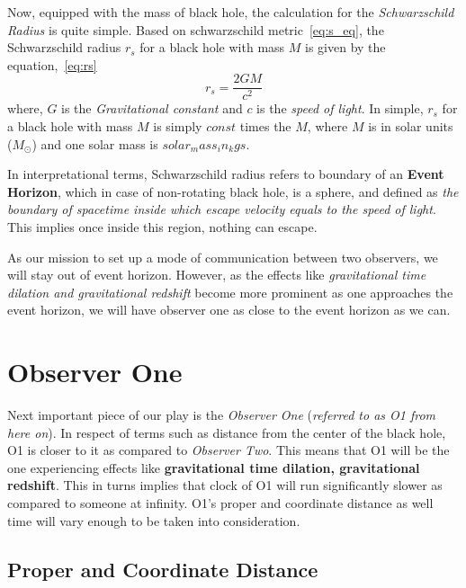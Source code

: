 Now, equipped with the mass of black hole, the calculation for the \emph{Schwarzschild Radius} is quite simple. Based on schwarzschild metric~\ref{eq:s_eq}, 
the Schwarzschild radius \(r_s\) for a black hole with mass \(M\) is given by the equation,~\ref{eq:rs}
\begin{equation}\label{eq:rs}
    r_s = \frac{2GM}{c^2} \tag{3.7}
\end{equation}
where, \(G\) is the \emph{Gravitational constant} and \(c\) is the \emph{speed of light}. In simple, \(r_s\) for a black hole with mass \(M\) is simply 
\(const\) times the \(M\), where \(M\) is in solar units (\(M_{\odot}\)) and one solar mass is \(solar_mass_in_kgs\). 

In interpretational terms, Schwarzschild radius refers to boundary of an \textbf{Event Horizon}, which in case of non-rotating black hole, is a sphere,
and defined as \textit{the boundary of spacetime inside which escape velocity equals to the speed of light}. This implies once inside this region, nothing can
escape. 

As our mission to set up a mode of communication between two observers, we will stay out of event horizon. However, as the effects like \emph{gravitational time dilation 
and gravitational redshift} become more prominent as one approaches the event horizon, we will have observer one as close to the event horizon as we can.

\section{Observer One}\label{sec:o1}

Next important piece of our play is the \emph{Observer One} (\textit{referred to as O1 from here on}). In respect of terms such as distance from the center of the black hole, O1 is closer to 
it as compared to \emph{Observer Two}. This means that O1 will be the one experiencing effects like \textbf{gravitational time dilation, gravitational redshift}. This in turns implies that clock of O1 
will run significantly slower as compared to someone at infinity. O1's proper and coordinate distance as well time will vary enough to be taken into consideration. 

\subsection{Proper and Coordinate Distance}\label{subsec:pd_cd}

